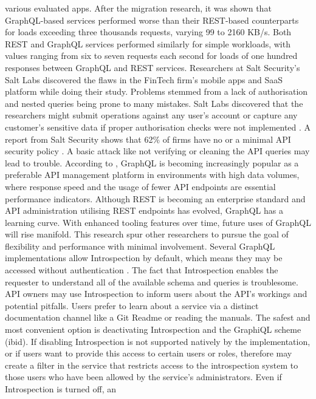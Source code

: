 various evaluated apps. After the migration research, it was shown that
GraphQL-based services performed worse than their REST-based counterparts for
loads exceeding three thousands requests, varying 99 to 2160 KB/s. Both
REST and GraphQL services performed similarly for simple workloads, with values
ranging from six to seven requests each second for loads of one hundred
responses between GraphQL and REST services. Researchers at Salt Security's Salt Labs discovered
the flaws in the FinTech firm's mobile apps and SaaS platform while doing their
study. Problems stemmed from a lack of authorisation and nested queries being
prone to many mistakes. Salt Labs discovered that the researchers might submit
operations against any user's account or capture any customer's sensitive data
if proper authorisation checks were not implemented
\citep{vadlamaniCanGraphQLReplace2021}. A
report from Salt Security shows that 62\% of firms have no or a minimal
API security policy \citep{vadlamaniCanGraphQLReplace2021}. A basic attack like
not verifying or cleaning the API queries may lead to trouble. According to
\citet{britoRESTVsGraphQL2020}, GraphQL is becoming increasingly popular as a
preferable API management platform in environments with high data volumes, where
response speed and the usage of fewer API endpoints are essential performance
indicators. Although REST is becoming an enterprise standard and API
administration utilising REST endpoints has evolved, GraphQL has a learning
curve. With enhanced tooling features over time, future uses of GraphQL will
rise manifold. This research spur other researchers to pursue the goal of flexibility and performance with minimal involvement.
Several GraphQL implementations allow Introspection by default, which means they
may be accessed without authentication \citep{eizingerAPIDesignDistributed2017}.
The fact that Introspection enables the requester to understand all of the
available schema and queries is troublesome. API owners may use Introspection to
inform users about the API's workings and potential pitfalls. Users prefer to
learn about a service via a distinct documentation channel like a Git Readme or
reading the manuals. The safest and most convenient option is deactivating
Introspection and the GraphiQL scheme (ibid). If disabling Introspection is not
supported natively by the implementation, or if users want to provide this
access to certain users or roles, therefore may create a filter in the service
that restricts access to the introspection system to those users who have been
allowed by the service's administrators. Even if Introspection is turned off, an
